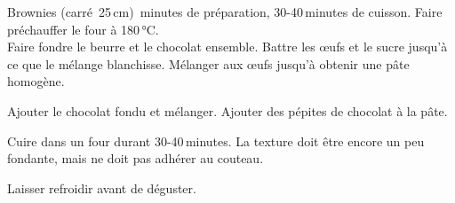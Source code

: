 \documentclass[12pt]{article}
\begin{document}
\begin{recipe}{Brownies (carré~25\,cm)}
\,minutes de préparation, 30-40\,minutes de cuisson.
\ingredient{}
\ingredient{} Faire préchauffer le four à 180\,°C.\\

 Faire fondre le beurre et le chocolat ensemble.
 Battre les œufs et le sucre jusqu’à ce que le mélange blan\-chis\-se.
 Mélanger aux œufs jusqu’à obtenir une pâte homogène.

 Ajouter le chocolat fondu et mélanger.
 Ajouter des pépites de chocolat à la pâte.

Cuire dans un four  durant 30-40\,minutes. La texture doit être encore un peu fondante, mais ne doit pas adhérer au couteau.

Laisser refroidir avant de déguster.
\end{recipe}
\end{document}
